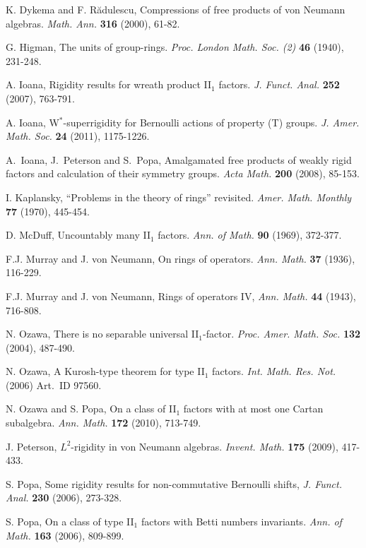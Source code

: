 \documentclass[a4paper,11pt]{amsart}
\numberwithin{equation}{section}
\begin{document}
\begin{thebibliography}{ABC90}
 {K. Dykema and F. R\u{a}dulescu},
Compressions of free products of von Neumann algebras.
{\it Math. Ann.} {\bf 316} (2000), 61-82.

 {G. Higman}, The units of group-rings.
{\it Proc. London Math. Soc. (2)} {\bf 46} (1940), 231-248.

 {A. Ioana}, Rigidity results for wreath product II$_1$ factors. {\it J. Funct. Anal.} {\bf 252} (2007), 763-791.

 {A. Ioana}, W$^*$-superrigidity for Bernoulli actions of property (T) groups. {\it J. Amer. Math. Soc.} {\bf 24} (2011), 1175-1226.

 {A.\ Ioana, J.\ Peterson and S.\ Popa},
Amalgamated free products of weakly rigid factors and calculation of their symmetry groups.
{\it Acta Math.} {\bf 200} (2008), 85-153.

 {I. Kaplansky}, ``Problems in the theory of rings'' revisited. {\it Amer. Math. Monthly} {\bf 77} (1970), 445-454.

 {D. McDuff},
Uncountably many II$_1$ factors.
{\it Ann. of Math.} {\bf 90} (1969), 372-377.

 {F.J. Murray and J. von Neumann}, On rings of
  operators. {\it Ann. Math.} {\bf 37} (1936), 116-229.

 {F.J. Murray and J. von Neumann}, Rings of operators
IV, {\it Ann. Math.} {\bf 44} (1943), 716-808.

 {N. Ozawa},
There is no separable universal II$_1$-factor.
{\it Proc. Amer. Math. Soc.} {\bf 132} (2004), 487-490.

 N. Ozawa,
A Kurosh-type theorem for type II$_1$ factors.
{\it Int. Math. Res. Not.} (2006) Art.\ ID 97560.

 {N. Ozawa and S. Popa}, On a class of II$_1$ factors with at
most one Cartan subalgebra. {\it Ann. Math.} {\bf 172} (2010), 713-749.

 {J. Peterson},
$L^2$-rigidity in von Neumann algebras.
{\it Invent. Math.} {\bf 175} (2009), 417-433.

 {S. Popa}, Some rigidity results for
non-commutative Bernoulli shifts, \emph{J. Funct. Anal.} \textbf{230} (2006), 273-328.

 {S. Popa}, On a class of type II$_1$ factors with Betti numbers invariants.
\emph{Ann. of Math.} \textbf{163} (2006), 809-899.


\end{thebibliography}
\end{document}
